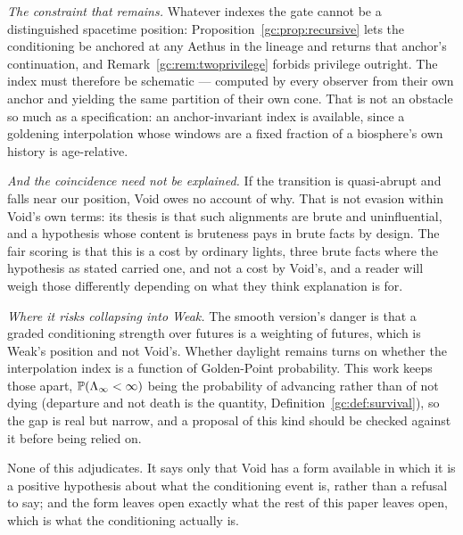 \begin{remark}
\emph{The constraint that remains.} Whatever indexes the gate cannot be
a distinguished spacetime position: Proposition~\ref{gc:prop:recursive}
lets the conditioning be anchored at any Aethus in the lineage and
returns that anchor's continuation, and
Remark~\ref{gc:rem:twoprivilege} forbids privilege outright. The index
must therefore be schematic --- computed by every observer from their
own anchor and yielding the same partition of their own cone. That is
not an obstacle so much as a specification: an anchor-invariant index
is available, since a goldening interpolation whose windows are a fixed
fraction of a biosphere's own history is age-relative.

\emph{And the coincidence need not be explained.} If the transition is
quasi-abrupt and falls near our position, Void owes no account of why.
That is not evasion within Void's own terms: its thesis is that such
alignments are brute and uninfluential, and a hypothesis whose content
is bruteness pays in brute facts by design. The fair scoring is that
this is a cost by ordinary lights, three brute facts where the
hypothesis as stated carried one, and not a cost by Void's, and a
reader will weigh those differently depending on what they think
explanation is for.

\emph{Where it risks collapsing into Weak.} The smooth version's danger
is that a graded conditioning strength over futures is a weighting of
futures, which is Weak's position and not Void's. Whether daylight
remains turns on whether the interpolation index is a function of
Golden-Point probability. This work keeps those apart, $\mathbb{P}(\Lambda_\infty<\infty)$ being the
probability of advancing rather than of not dying (departure and not death
is the quantity, Definition~\ref{gc:def:survival}), so the gap is real
but narrow, and a proposal of this kind should be checked against it
before being relied on.

None of this adjudicates. It says only that Void has a form available in
which it is a positive hypothesis about what the conditioning event is,
rather than a refusal to say; and the form leaves open exactly what the
rest of this paper leaves open, which is what the conditioning
actually is.
\end{remark}

